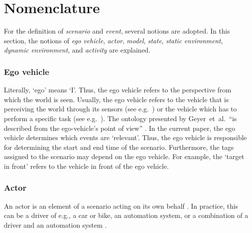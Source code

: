 \section{Nomenclature}
\label{sec:nomenclature}

For the definition of \emph{scenario} and \emph{event}, several notions are adopted. In this section, the notions of \emph{ego vehicle}, \emph{actor}, \emph{model}, \emph{state}, \emph{static environment}, \emph{dynamic environment}, and \emph{activity} are explained. 

\subsubsection{Ego vehicle}
\label{sec:ego vehicle}
Literally, `ego' means `I'. Thus, the ego vehicle refers to the perspective from which the world is seen. Usually, the ego vehicle refers to the vehicle that is perceiving the world through its sensors (see e.g.~\cite{Bonnin2014}) or the vehicle which has to perform a specific task (see e.g.~\cite{althoff2017CommonRoad}). The ontology presented by Geyer~et~al.\ ``is described from the ego-vehicle's point of view'' \cite{geyer2014}. In the current paper, the ego vehicle determines which events are `relevant'. Thus, the ego vehicle is responsible for determining the start and end time of the scenario. Furthermore, the tags assigned to the scenario may depend on the ego vehicle. For example, the `target in front' refers to the vehicle in front of the ego vehicle. 


\subsubsection{Actor}
\label{sec:actor}
An actor is an element of a scenario acting on its own behalf \cite{ulbrich2015}. In practice, this can be a driver of e.g., a car or bike, an automation system, or a combination of a driver and an automation system \cite{geyer2014}.

